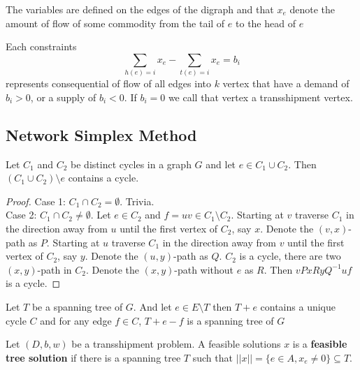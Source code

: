                 The variables are defined on the edges of the digraph and that $x_e$ denote the amount of flow of some commodity from the tail of $e$ to the head of $e$

                Each constraints
                \begin{equation*}
                    \sum_{h(e) = i} x_e - \sum_{t(e) = i}x_e = b_i
                \end{equation*}
                represents consequential of flow of all edges into $k$ vertex that have a demand of $b_i > 0$, or a supply of $b_i < 0$. If $b_i = 0$ we call that vertex a transshipment vertex.

            \subsection{Network Simplex Method}
                \begin{lemma}
                    Let $C_1$ and $C_2$ be distinct cycles in a graph $G$ and let $e\in C_1 \cup C_2$. Then $(C_1 \cup C_2) \setminus e$ contains a cycle.
                \end{lemma}

                \begin{proof}
                    Case 1: $C_1 \cap C_2 = \emptyset$. Trivia.\\
                    Case 2: $C_1 \cap C_2 \neq \emptyset$. Let $e\in C_2$ and $f=uv \in C_1 \setminus C_2$. Starting at $v$ traverse $C_1$ in the direction away from $u$ until the first vertex of $C_2$, say $x$. Denote the $(v, x)$-path as $P$. Starting at $u$ traverse $C_1$ in the direction away from $v$ until the first vertex of $C_2$, say $y$. Denote the $(u, y)$-path as $Q$. $C_2$ is a cycle, there are two $(x, y)$-path in $C_2$. Denote the $(x, y)$-path without $e$ as $R$. Then $vPxRyQ^{-1}uf$ is a cycle.
                \end{proof}

                \begin{theorem}
                    Let $T$ be a spanning tree of $G$. And let $e\in E\setminus T$ then $T+e$ contains a unique cycle $C$ and for any edge $f\in C$, $T+e-f$ is a spanning tree of $G$
                \end{theorem}

                Let $(D, b, w)$ be a transshipment problem. A feasible solutions $x$ is a \textbf{feasible tree solution} if there is a spanning tree $T$ such that $||x|| = \{e\in A, x_e\neq 0\} \subseteq T$.

